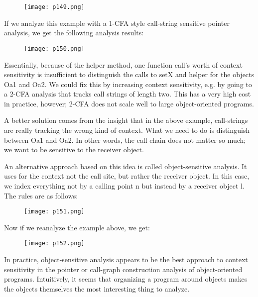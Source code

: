 \begin{figure}[H]
	\centering
	\texttt{[image: p149.png]}
	\caption{}
	\label{fig:p149}
\end{figure}


If we analyze this example with a 1-CFA style call-string sensitive pointer analysis, we get the
following analysis results:


\begin{figure}[H]
	\centering
	\texttt{[image: p150.png]}
	\caption{}
	\label{fig:p150}
\end{figure}


Essentially, because of the helper method, one function call’s worth of context sensitivity is
insufficient to distinguish the calls to setX and helper for the objects Oa1 and Oa2. We could fix
this by increasing context sensitivity, e.g. by going to a 2-CFA analysis that tracks call strings of
length two. This has a very high cost in practice, however; 2-CFA does not scale well to large
object-oriented programs.

A better solution comes from the insight that in the above example, call-strings are really tracking the wrong kind of context. What we need to do is distinguish between Oa1 and Oa2. In other
words, the call chain does not matter so much; we want to be sensitive to the receiver object.

An alternative approach based on this idea is called object-sensitive analysis. It uses for the
context not the call site, but rather the receiver object. In this case, we index everything not by a
calling point n but instead by a receiver object l. The rules are as follows:


\begin{figure}[H]
	\centering
	\texttt{[image: p151.png]}
	\caption{}
	\label{fig:p151}
\end{figure}


Now if we reanalyze the example above, we get:


\begin{figure}[H]
	\centering
	\texttt{[image: p152.png]}
	\caption{}
	\label{fig:p152}
\end{figure}

In practice, object-sensitive analysis appears to be the best approach to context sensitivity in
the pointer or call-graph construction analysis of object-oriented programs. Intuitively, it seems
that organizing a program around objects makes the objects themselves the most interesting thing
to analyze.

